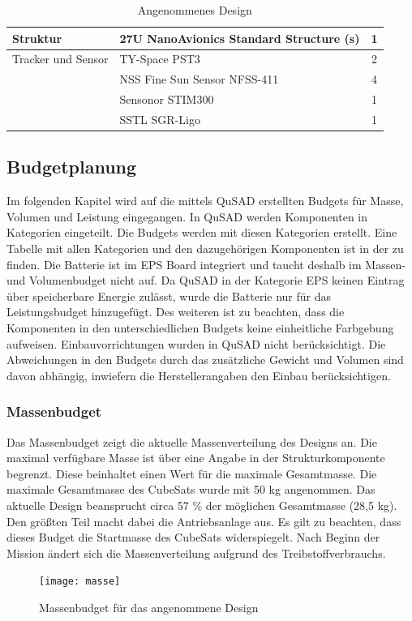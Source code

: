 \begin{table}[!ht]
\begin{tabular}{|l|l|c|}
Struktur                        & 27U NanoAvionics Standard Structure (s)       & 1      \\ \hline
Tracker und Sensor               & TY-Space PST3                                 & 2      \\ \hline
                                & NSS Fine Sun Sensor NFSS-411                  & 4      \\ \hline
                                & Sensonor STIM300                              & 1      \\ \hline
                                & SSTL SGR-Ligo                                 & 1      \\ \hline
\end{tabular}
\caption{Angenommenes Design \cite{Lettau.}}
\label{tab:cubesatdesign}
\end{table}
	
				\subsection{Budgetplanung}
Im folgenden Kapitel wird auf die mittels QuSAD erstellten Budgets für Masse, Volumen und Leistung eingegangen. In QuSAD werden Komponenten in Kategorien eingeteilt. Die Budgets werden mit diesen Kategorien erstellt. Eine Tabelle mit allen Kategorien und den dazugehörigen Komponenten ist in der  zu finden. Die Batterie ist im EPS Board integriert und taucht deshalb im Massen- und Volumenbudget nicht auf. Da QuSAD in der Kategorie EPS keinen Eintrag über speicherbare Energie zulässt, wurde die Batterie nur für das Leistungsbudget hinzugefügt. Des weiteren ist zu beachten, dass die Komponenten in den unterschiedlichen Budgets keine einheitliche Farbgebung aufweisen. Einbauvorrichtungen wurden in QuSAD nicht berücksichtigt. Die Abweichungen in den Budgets durch das  zusätzliche Gewicht und Volumen sind davon abhängig, inwiefern die Herstellerangaben den Einbau berücksichtigen.

						\subsubsection{Massenbudget}
Das Massenbudget  zeigt die aktuelle Massenverteilung des Designs an. Die maximal verfügbare Masse ist über eine Angabe in der Strukturkomponente begrenzt. Diese beinhaltet einen Wert für die maximale Gesamtmasse. Die maximale Gesamtmasse des CubeSats wurde mit 50 kg angenommen. Das aktuelle Design beansprucht circa 57 \% der möglichen Gesamtmasse (28,5 kg). Den größten Teil macht dabei die Antriebsanlage aus. Es gilt zu beachten, dass dieses Budget die Startmasse des CubeSats widerspiegelt. Nach Beginn der Mission ändert sich die Massenverteilung aufgrund des Treibstoffverbrauchs.
										\begin{figure}[!h]
											\centering
												\texttt{[image: masse]}
											\caption{Massenbudget für das angenommene Design}
											\label{fig:masse}
										\end{figure}
								
